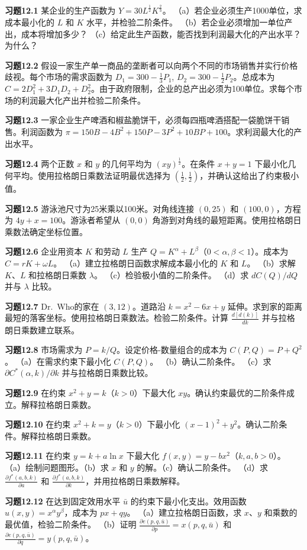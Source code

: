 \begin{translation}
\textbf{习题12.1} 某企业的生产函数为 $Y = 30L^{\frac{1}{2}}K^{\frac{2}{3}}$。
（a）若企业必须生产1000单位，求成本最小化的 $L$ 和 $K$ 水平，并检验二阶条件。
（b）若企业必须增加一单位产出，成本将增加多少？
（c）给定此生产函数，能否找到利润最大化的产出水平？为什么？

\textbf{习题12.2} 假设一家生产单一商品的垄断者可以向两个不同的市场销售并实行价格歧视。每个市场的需求函数为 $D_1 = 300 - \frac{1}{3}P_1$, $D_2 = 300 - \frac{1}{2}P_2$。总成本为 $C = 2D_1^2 + 3D_1D_2 + D_2^2$。由于政府限制，企业的总产出必须为100单位。求每个市场的利润最大化产出并检验二阶条件。

\textbf{习题12.3} 一家企业生产啤酒和椒盐脆饼干，必须每四瓶啤酒搭配一袋脆饼干销售。利润函数为 $\pi = 150B - 4B^2 + 150P - 3P^2 + 10BP + 100$。求利润最大化的产出水平。

\textbf{习题12.4} 两个正数 $x$ 和 $y$ 的几何平均为 $(xy)^{\frac{1}{2}}$。在条件 $x + y = 1$ 下最小化几何平均。使用拉格朗日乘数法证明最优选择为 $(\frac{1}{2}, \frac{1}{2})$，并确认这给出了约束极小值。

\textbf{习题12.5} 游泳池尺寸为25米乘以100米。对角线连接 $(0,25)$ 和 $(100,0)$，方程为 $4y + x = 100$。游泳者希望从 $(0,0)$ 角游到对角线的最短距离。使用拉格朗日乘数法确定坐标位置。

\textbf{习题12.6} 企业用资本 $K$ 和劳动 $L$ 生产 $Q = K^\alpha + L^\beta$（$0 < \alpha, \beta < 1$）。成本为 $C = rK + \omega L$。
（a）建立拉格朗日函数求解成本最小化的 $K$ 和 $L$。
（b）求解 $K$、$L$ 和拉格朗日乘数 $\lambda$。
（c）检验极小值的二阶条件。
（d）求 $dC(Q)/dQ$ 并与 $\lambda$ 比较。

\textbf{习题12.7} Dr.\ Who的家在 $(3,12)$。道路沿 $k = x^2 - 6x + y$ 延伸。求到家的距离最短的落客坐标。使用拉格朗日乘数法。检验二阶条件。计算 $\frac{d[d(k)]}{dk}$ 并与拉格朗日乘数建立联系。

\textbf{习题12.8} 市场需求为 $P = k/Q$。设定价格-数量组合的成本为 $C(P,Q) = P + Q^2$。
（a）在需求约束下最小化 $C(P,Q)$。
（b）确认二阶条件。
（c）求 $\partial C^*(\alpha, k)/\partial k$ 并与拉格朗日乘数比较。

\textbf{习题12.9} 在约束 $x^2 + y = k$（$k > 0$）下最大化 $xy$。确认约束最优的二阶条件成立。解释拉格朗日乘数。

\textbf{习题12.10} 在约束 $x^2 + k = y$（$k > 0$）下最小化 $(x - 1)^2 + y^2$。确认二阶条件。解释拉格朗日乘数。

\textbf{习题12.11} 在约束 $y = k + a\ln x$ 下最大化 $f(x, y) = y - bx^2$（$k, a, b > 0$）。
（a）绘制问题图形。（b）求 $x$ 和 $y$ 的解。（c）确认二阶条件。
（d）求 $\frac{\partial f^*(a,b,k)}{\partial a}$ 和 $\frac{\partial f^*(a,b,k)}{\partial k}$，并用拉格朗日乘数解释。

\textbf{习题12.12} 在达到固定效用水平 $\bar{u}$ 的约束下最小化支出。效用函数 $u(x, y) = x^\alpha y^\beta$，成本为 $px + qy$。
（a）建立拉格朗日函数，求 $x$、$y$ 和乘数的最优值，检验二阶条件。
（b）证明 $\frac{\partial e(p, q, \bar{u})}{\partial p} = x(p, q, \bar{u})$ 和 $\frac{\partial e(p, q, \bar{u})}{\partial q} = y(p, q, \bar{u})$。
\end{translation}
